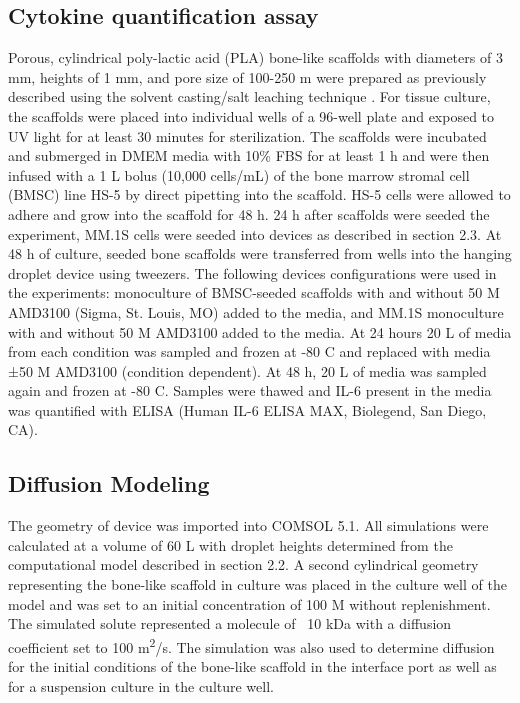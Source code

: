 \subsection{Cytokine quantification assay}
Porous, cylindrical poly-lactic acid (PLA) bone-like scaffolds with diameters of 3 mm, heights of 1 mm, and pore size of 100-250 \textmu m were prepared as previously described using the solvent casting/salt leaching technique \cite{Mikos1994, Murphy2000}. For tissue culture, the scaffolds were placed into individual wells of a 96-well plate and exposed to UV light for at least 30 minutes for sterilization. The scaffolds were incubated and submerged in DMEM media with 10\% FBS for at least 1 h and were then infused with a 1 \textmu L bolus (10,000 cells/mL) of the bone marrow stromal cell (BMSC) line HS-5 by direct pipetting into the scaffold. HS-5 cells were allowed to adhere and grow into the scaffold for 48 h. 24 h after scaffolds were seeded the experiment, MM.1S cells were seeded into devices as described in section 2.3. At 48 h of culture, seeded bone scaffolds were transferred from wells into the hanging droplet device using tweezers. The following devices configurations were used in the experiments: monoculture of BMSC-seeded scaffolds with and without 50 \textmu M AMD3100 (Sigma, St. Louis, MO) added to the media, and MM.1S monoculture with and without 50 \textmu M AMD3100 added to the media. At 24 hours 20 L of media from each condition was sampled and frozen at -80 C and replaced with media ±50 \textmu M AMD3100 (condition dependent). At 48 h, 20 L of media was sampled again and frozen at -80 C. Samples were thawed and IL-6 present in the media was quantified with ELISA (Human IL-6 ELISA MAX, Biolegend, San Diego, CA). 
 
\subsection{Diffusion Modeling}
The geometry of device was imported into COMSOL 5.1. All simulations were calculated at a volume of 60 L with droplet heights determined from the computational model described in section 2.2. A second cylindrical geometry representing the bone-like scaffold in culture was placed in the culture well of the model and was set to an initial concentration of 100 \textmu M without replenishment. The simulated solute represented a molecule of ~10 kDa with a diffusion coefficient set to 100 \textmu m\textsuperscript{2}/s. The simulation was also used to determine diffusion for the initial conditions of the bone-like scaffold in the interface port as well as for a suspension culture in the culture well. 

